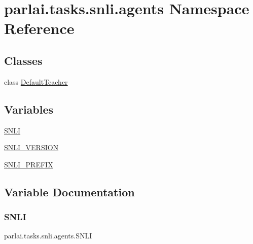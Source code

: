 \hypertarget{namespaceparlai_1_1tasks_1_1snli_1_1agents}{}\section{parlai.\+tasks.\+snli.\+agents Namespace Reference}
\label{namespaceparlai_1_1tasks_1_1snli_1_1agents}
\subsection*{Classes}
\begin{DoxyCompactItemize}
\item 
class \hyperlink{classparlai_1_1tasks_1_1snli_1_1agents_1_1DefaultTeacher}{Default\+Teacher}
\end{DoxyCompactItemize}
\subsection*{Variables}
\begin{DoxyCompactItemize}
\item 
\hyperlink{namespaceparlai_1_1tasks_1_1snli_1_1agents_a20883edf1cdea88d223e44cf99057d77}{S\+N\+LI}
\item 
\hyperlink{namespaceparlai_1_1tasks_1_1snli_1_1agents_a1da4de754ef1fdc40ee41d18accd82ff}{S\+N\+L\+I\+\_\+\+V\+E\+R\+S\+I\+ON}
\item 
\hyperlink{namespaceparlai_1_1tasks_1_1snli_1_1agents_a06e51d70f61da5ff94e1ffccdce02cc7}{S\+N\+L\+I\+\_\+\+P\+R\+E\+F\+IX}
\end{DoxyCompactItemize}


\subsection{Variable Documentation}
\mbox{\label{namespaceparlai_1_1tasks_1_1snli_1_1agents_a20883edf1cdea88d223e44cf99057d77}} 
\subsubsection{\texorpdfstring{S\+N\+LI}{SNLI}}
{\footnotesize\ttfamily parlai.\+tasks.\+snli.\+agents.\+S\+N\+LI}



